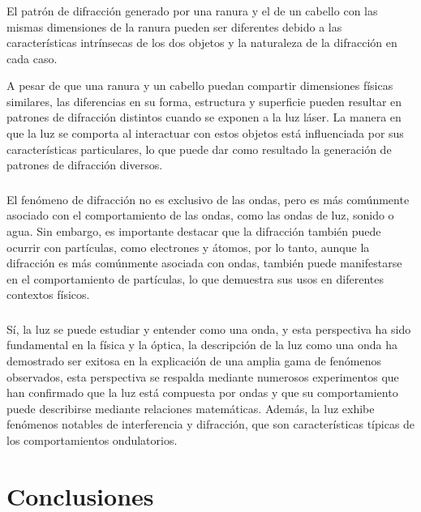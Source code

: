 \documentclass[twocolumn, 12pt]{article}
\begin{document}
\subsubsection{}

El patrón de difracción generado por una ranura y el de un
cabello con las mismas dimensiones de la ranura pueden ser
diferentes debido a las características intrínsecas de los
dos objetos y la naturaleza de la difracción en cada caso.

A pesar de que una ranura y un cabello puedan compartir
dimensiones físicas similares, las diferencias en su forma,
estructura y superficie pueden resultar en patrones de
difracción distintos cuando se exponen a la luz láser. La
manera en que la luz se comporta al interactuar con estos
objetos está influenciada por sus características
particulares, lo que puede dar como resultado la generación
de patrones de difracción diversos.

\subsubsection{}

El fenómeno de difracción no es exclusivo de las ondas,
pero es más comúnmente asociado con el comportamiento de
las ondas, como las ondas de luz, sonido o agua. Sin
embargo, es importante destacar que la difracción también
puede ocurrir con partículas, como electrones y átomos, por
lo tanto, aunque la difracción es más comúnmente asociada
con ondas, también puede manifestarse en el comportamiento
de partículas, lo que demuestra sus usos en diferentes
contextos físicos.

\subsubsection{}

Sí, la luz se puede estudiar y entender como una onda, y
esta perspectiva ha sido fundamental en la física y la
óptica, la descripción de la luz como una onda ha
demostrado ser exitosa en la explicación de una amplia gama
de fenómenos observados, esta perspectiva se respalda
mediante numerosos experimentos que han confirmado que la
luz está compuesta por ondas y que su comportamiento puede
describirse mediante relaciones matemáticas. Además, la luz
exhibe fenómenos notables de interferencia y difracción,
que son características típicas de los comportamientos
ondulatorios.

\section{Conclusiones}

\printbibliography
\end{document}
